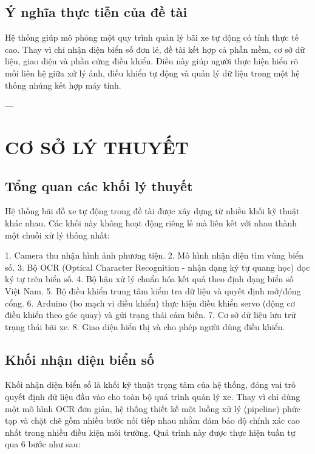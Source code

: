 \documentclass[a4paper,14pt]{extreport}
\begin{document}
\section{Ý nghĩa thực tiễn của đề tài}

Hệ thống giúp mô phỏng một quy trình quản lý bãi xe tự động có tính thực tế cao. Thay vì chỉ nhận diện biển số đơn lẻ, đề tài kết hợp cả phần mềm, cơ sở dữ liệu, giao diện và phần cứng điều khiển. Điều này giúp người thực hiện hiểu rõ mối liên hệ giữa xử lý ảnh, điều khiển tự động và quản lý dữ liệu trong một hệ thống nhúng kết hợp máy tính.

---

\chapter{CƠ SỞ LÝ THUYẾT}

\section{Tổng quan các khối lý thuyết}

Hệ thống bãi đỗ xe tự động trong đề tài được xây dựng từ nhiều khối kỹ thuật khác nhau. Các khối này không hoạt động riêng lẻ mà liên kết với nhau thành một chuỗi xử lý thống nhất:

1. Camera thu nhận hình ảnh phương tiện.
2. Mô hình nhận diện tìm vùng biển số.
3. Bộ OCR (Optical Character Recognition - nhận dạng ký tự quang học) đọc ký tự trên biển số.
4. Bộ hậu xử lý chuẩn hóa kết quả theo định dạng biển số Việt Nam.
5. Bộ điều khiển trung tâm kiểm tra dữ liệu và quyết định mở/đóng cổng.
6. Arduino (bo mạch vi điều khiển) thực hiện điều khiển servo (động cơ điều khiển theo góc quay) và gửi trạng thái cảm biến.
7. Cơ sở dữ liệu lưu trữ trạng thái bãi xe.
8. Giao diện hiển thị và cho phép người dùng điều khiển.

\section{Khối nhận diện biển số}

Khối nhận diện biển số là khối kỹ thuật trọng tâm của hệ thống, đóng vai trò quyết định dữ liệu đầu vào cho toàn bộ quá trình quản lý xe. Thay vì chỉ dùng một mô hình OCR đơn giản, hệ thống thiết kế một luồng xử lý (pipeline) phức tạp và chặt chẽ gồm nhiều bước nối tiếp nhau nhằm đảm bảo độ chính xác cao nhất trong nhiều điều kiện môi trường. Quá trình này được thực hiện tuần tự qua 6 bước như sau:
\end{document}
